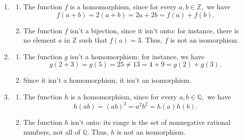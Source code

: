\documentclass[10pt,]{book}
\theoremstyle{plain}
\theoremstyle{definition}
\theoremstyle{definition}
\theoremstyle{definition}
\theoremstyle{definition}
\numberwithin{equation}{section}
\def\Z{\mathbb{Z}}
\def\Q{\mathbb{Q}}
\begin{document}
\par\smallskip
\leavevmode%
\begin{enumerate}[label=(\alph*)]
\item\hypertarget{li-165}{}%
\begin{enumerate}[label=\roman*.]
\item\hypertarget{li-166}{}
            The function \(f\) is a homomorphism, since for every \(a,b \in
            \Z,\) we have
\begin{equation*}

              f(a+b)=2(a+b)=2a+2b=f(a)+f(b).
            
\end{equation*}

\item\hypertarget{li-167}{}
            The function \(f\) isn't a bijection, since it isn't onto: for instance, there is
            no element \(a\) in \(\Z\) such that \(f(a)=3\). Thus, \(f\) is not an
            isomorphism.
\end{enumerate}
%
\item\hypertarget{li-168}{}%
\begin{enumerate}[label=\roman*.]
\item\hypertarget{li-169}{}
            The function \(g\) isn't a homomorphism: for instance, we have
\begin{equation*}

              g(2+3)=g(5)=25\neq 13=4+9=g(2)+g(3).
            
\end{equation*}

\item\hypertarget{li-170}{}
            Since it isn't a homomorphism, it isn't an isomorphism.
\end{enumerate}
%
\item\hypertarget{li-171}{}%
\begin{enumerate}[label=\roman*.]
\item\hypertarget{li-172}{}
            The function \(h\) is a homomorphism, since for every \(a,b \in
            \Q,\) we have
\begin{equation*}

              h(ab)=(ab)^2=a^2b^2=h(a)h(b).
            
\end{equation*}

\item\hypertarget{li-173}{}
            The function \(h\) isn't onto: its range is the set of nonnegative rational
            numbers, not all of \(\Q\). Thus, \(h\) is not an isomorphism.
\end{enumerate}
%
\end{enumerate}
\end{document}
